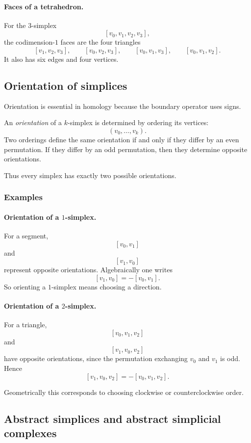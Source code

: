 \documentclass[12pt,a4paper]{article}
\theoremstyle{notespace}
\begin{document}
\paragraph{Faces of a tetrahedron.}
For the \(3\)-simplex
\[
[v_0,v_1,v_2,v_3],
\]
the codimension-\(1\) faces are the four triangles
\[
[v_1,v_2,v_3],\qquad
[v_0,v_2,v_3],\qquad
[v_0,v_1,v_3],\qquad
[v_0,v_1,v_2].
\]
It also has six edges and four vertices.

\subsection{Orientation of simplices}

Orientation is essential in homology because the boundary operator uses signs.

An \emph{orientation} of a \(k\)-simplex is determined by ordering its vertices:
\[
(v_0,\dots,v_k).
\]
Two orderings define the same orientation if and only if they differ by an even permutation. If they differ by an odd permutation, then they determine opposite orientations.

Thus every simplex has exactly two possible orientations.

\subsubsection{Examples}

\paragraph{Orientation of a \(1\)-simplex.}
For a segment,
\[
[v_0,v_1]
\]
and
\[
[v_1,v_0]
\]
represent opposite orientations. Algebraically one writes
\[
[v_1,v_0]=-[v_0,v_1].
\]
So orienting a \(1\)-simplex means choosing a direction.

\paragraph{Orientation of a \(2\)-simplex.}
For a triangle,
\[
[v_0,v_1,v_2]
\]
and
\[
[v_1,v_0,v_2]
\]
have opposite orientations, since the permutation exchanging \(v_0\) and \(v_1\) is odd. Hence
\[
[v_1,v_0,v_2]=-[v_0,v_1,v_2].
\]

Geometrically this corresponds to choosing clockwise or counterclockwise order.

\subsection{Abstract simplices and abstract simplicial complexes}
\end{document}
